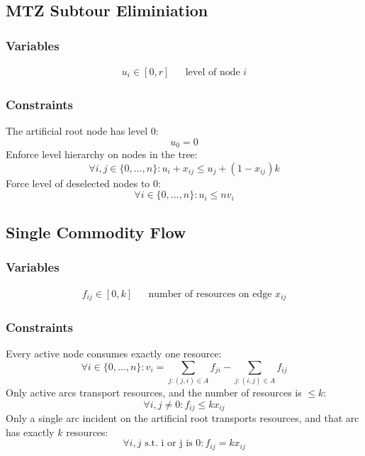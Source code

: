 \documentclass{article}
\begin{document}
\subsection{MTZ Subtour Eliminiation}


\subsubsection{Variables}
\begin{eqnarray}
u_i \in [0,r]  && \text{level of node $i$}
\end{eqnarray}
\subsubsection{Constraints}
The artificial root node has level $0$:
\begin{equation}
u_0 = 0
\end{equation}
Enforce level hierarchy on nodes in the tree:
\begin{equation}
\forall i, j \in\{0,\ldots,n\}: u_i + x_{ij} \leq u_j + (1 - x_{ij})k
\end{equation}
Force level of deselected nodes to $0$:
\begin{equation}
\forall i \in \{0,\ldots,n\}: u_i \leq nv_i
\end{equation}

\subsection{Single Commodity Flow}
\subsubsection{Variables}
\begin{eqnarray}
f_{ij} \in [0, k]  && \text{number of resources on edge } x_{ij}
\end{eqnarray}
\subsubsection{Constraints}
Every active node consumes exactly one resource:
\begin{equation}
\forall i \in \{0,\ldots,n\}: v_i = \sum_{j: (j, i) \in A} f_{ji} - \sum_{j: (i, j) \in A} f_{ij}
\end{equation}
Only active arcs transport resources, and the number of resources is $\leq k$:
\begin{equation}
\forall i, j \neq 0: f_{ij} \leq kx_{ij}
\end{equation}
Only a single arc incident on the artificial root transports resources, and that arc
has exactly $k$ resources:
\begin{equation}
\forall i, j \text{ s.t. i or j is 0}: f_{ij} = kx_{ij}
\end{equation}
\end{document}
